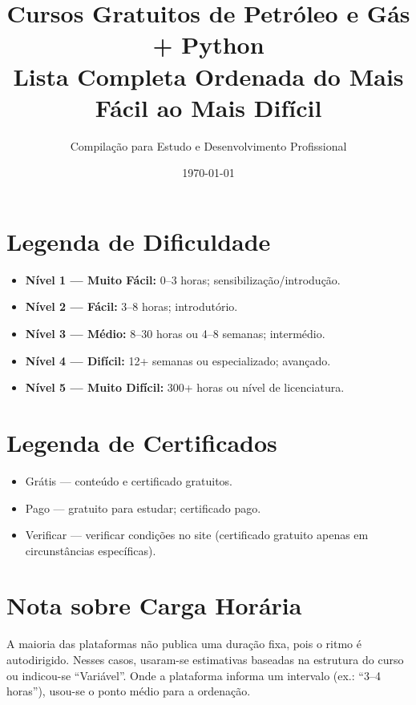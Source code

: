\documentclass[11pt,a4paper]{article}
\title{\textbf{Cursos Gratuitos de Petróleo e Gás + Python}\\[0.5em]
\large Lista Completa Ordenada do Mais Fácil ao Mais Difícil}
\author{Compilação para Estudo e Desenvolvimento Profissional}
\date{\today}
\newcommand{\gr}{\textcolor{green!60!black}{Grátis}}
\newcommand{\pg}{\textcolor{red!70!black}{Pago}}
\newcommand{\vr}{\textcolor{orange!80!black}{Verificar}}
\begin{document}
\maketitle
\tableofcontents
\newpage

\section*{Legenda de Dificuldade}
\begin{itemize}[leftmargin=*]
    \item \textbf{Nível 1 --- Muito Fácil:} 0--3 horas; sensibilização/introdução.
    \item \textbf{Nível 2 --- Fácil:} 3--8 horas; introdutório.
    \item \textbf{Nível 3 --- Médio:} 8--30 horas ou 4--8 semanas; intermédio.
    \item \textbf{Nível 4 --- Difícil:} 12+ semanas ou especializado; avançado.
    \item \textbf{Nível 5 --- Muito Difícil:} 300+ horas ou nível de licenciatura.
\end{itemize}

\section*{Legenda de Certificados}
\begin{itemize}[leftmargin=*]
    \item \gr{} --- conteúdo e certificado gratuitos.
    \item \pg{} --- gratuito para estudar; certificado pago.
    \item \vr{} --- verificar condições no site (certificado gratuito apenas em circunstâncias específicas).
\end{itemize}

\section*{Nota sobre Carga Horária}
A maioria das plataformas não publica uma duração fixa, pois o ritmo é autodirigido. Nesses casos, usaram-se estimativas baseadas na estrutura do curso ou indicou-se ``Variável''. Onde a plataforma informa um intervalo (ex.: ``3--4 horas''), usou-se o ponto médio para a ordenação.
\end{document}
